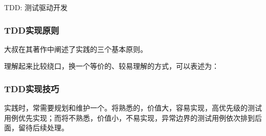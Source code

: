 \begin{content}
\begin{episode}{TDD: 测试驱动开发}
\begin{content}
\subsubsection{TDD实现原则}

大叔在其著作中阐述了实践的三个基本原则。

\begin{enum}
\end{enum}

理解起来比较绕口，换一个等价的、较易理解的方式，可以表述为：

\begin{enum}
\end{enum}

\subsubsection{TDD实现技巧}

实践时，常需要规划和维护一个。将熟悉的，价值大，容易实现，高优先级的测试用例优先实现；而将不熟悉，价值小，不易实现，异常边界的测试用例依次排到后面，留待后续处理。

\begin{enum}
\end{enum}

\end{content}
\end{episode}


\end{content}

